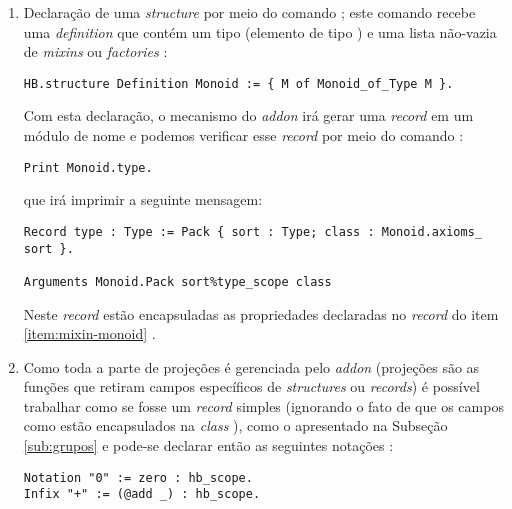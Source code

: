 {{\begin{enumerate}
        \item Declaração de uma \textit{structure} por meio do comando ; este comando recebe uma \textit{definition} que contém um tipo (elemento de tipo ) e uma lista não-vazia de \textit{mixins} ou \textit{factories} \cite{cohen:hal-02478907}:
            \begin{lstlisting}[language=coq, frame=single, tabsize=1]
HB.structure Definition Monoid := { M of Monoid_of_Type M }.
            \end{lstlisting}
        Com esta declaração, o mecanismo do \textit{addon}  irá gerar uma \textit{record} em um módulo de nome  e podemos verificar esse \textit{record} por meio do comando \cite{cohen:hal-02478907}:
            \begin{lstlisting}[language=coq, frame=single, tabsize=1]
Print Monoid.type.   
            \end{lstlisting}
        que irá imprimir a seguinte mensagem:
            \begin{lstlisting}[language=coq-error, frame=single, tabsize=1]
Record type : Type := Pack { sort : Type; class : Monoid.axioms_ sort }.

Arguments Monoid.Pack sort%type_scope class
            \end{lstlisting}
        Neste \textit{record} estão encapsuladas as propriedades declaradas no \textit{record} do item \ref{item:mixin-monoid} \cite{cohen:hal-02478907}.
    
        \item Como toda a parte de projeções é gerenciada pelo \textit{addon}  (projeções são as funções que retiram campos específicos de \textit{structures} ou \textit{records}) é possível trabalhar como se  fosse um \textit{record} simples (ignorando o fato de que os campos como  estão encapsulados na \textit{class} ), como o apresentado na Subseção \ref{sub:grupos} e pode-se declarar então as seguintes notações \cite{cohen:hal-02478907}:
            \begin{lstlisting}[language=coq, frame=single, tabsize=1]
Notation "0" := zero : hb_scope.
Infix "+" := (@add _) : hb_scope.
            \end{lstlisting}


\end{enumerate}}}
